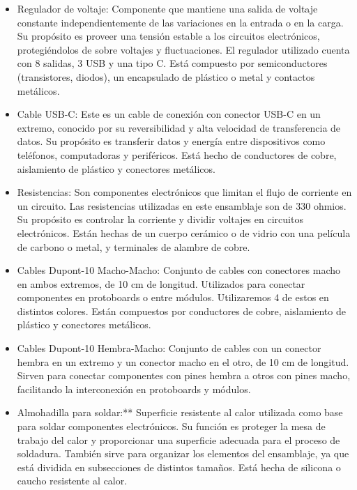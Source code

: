 \begin{itemize}
    \item Regulador de voltaje: Componente que mantiene una salida de voltaje constante independientemente de las variaciones en la entrada o en la carga. Su propósito es proveer una tensión estable a los circuitos electrónicos, protegiéndolos de sobre voltajes y fluctuaciones. El regulador utilizado cuenta con 8 salidas, 3 USB y una tipo C. Está compuesto por semiconductores (transistores, diodos), un encapsulado de plástico o metal y contactos metálicos.
    
    \item Cable USB-C: Este es un cable de conexión con conector USB-C en un extremo, conocido por su reversibilidad y alta velocidad de transferencia de datos. Su propósito es transferir datos y energía entre dispositivos como teléfonos, computadoras y periféricos. Está hecho de conductores de cobre, aislamiento de plástico y conectores metálicos.
    
    \item Resistencias: Son componentes electrónicos que limitan el flujo de corriente en un circuito. Las resistencias utilizadas en este ensamblaje son de 330 ohmios. Su propósito es controlar la corriente y dividir voltajes en circuitos electrónicos. Están hechas de un cuerpo cerámico o de vidrio con una película de carbono o metal, y terminales de alambre de cobre.
    
    \item Cables Dupont-10 Macho-Macho: Conjunto de cables con conectores macho en ambos extremos, de 10 cm de longitud. Utilizados para conectar componentes en protoboards o entre módulos. Utilizaremos 4 de estos en distintos colores. Están compuestos por conductores de cobre, aislamiento de plástico y conectores metálicos.
    
    \item Cables Dupont-10 Hembra-Macho: Conjunto de cables con un conector hembra en un extremo y un conector macho en el otro, de 10 cm de longitud. Sirven para conectar componentes con pines hembra a otros con pines macho, facilitando la interconexión en protoboards y módulos.
    
    \item Almohadilla para soldar:** Superficie resistente al calor utilizada como base para soldar componentes electrónicos. Su función es proteger la mesa de trabajo del calor y proporcionar una superficie adecuada para el proceso de soldadura. También sirve para organizar los elementos del ensamblaje, ya que está dividida en subsecciones de distintos tamaños. Está hecha de silicona o caucho resistente al calor.
    \end{itemize}
